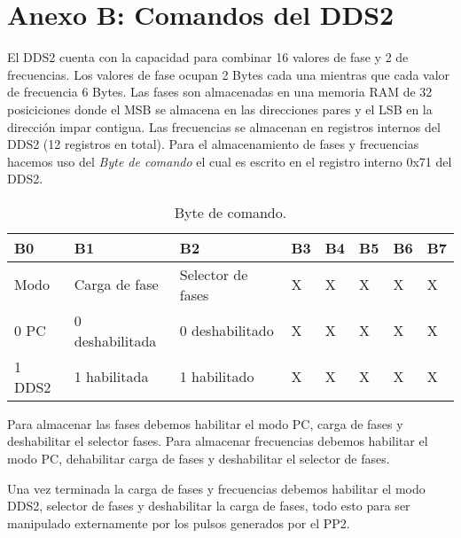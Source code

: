 \section{Anexo B: Comandos del DDS2}
El DDS2 cuenta con la capacidad para combinar 16 valores de fase y 2 de frecuencias.
Los valores de fase ocupan 2 Bytes cada una mientras que cada valor de frecuencia 6 Bytes.
Las fases son almacenadas en una memoria RAM de 32 posiciciones donde el MSB se
almacena en las direcciones pares y el LSB en la direcci\'on impar contigua.
Las frecuencias se almacenan en registros internos del DDS2 (12 registros en total).
Para el almacenamiento de fases y frecuencias hacemos uso del \textit{Byte de comando}
el cual es escrito en el registro interno 0x71 del DDS2. 

\begin{table}[ht]
    \centering
    \begin{tabular}{|l|l|l|l|l|l|l|l|}
    \hline 
    B0 & B1 & B2 & B3 & B4 & B5 & B6 & B7 \\
    \hline
    Modo   & Carga de fase    & Selector de fases & X & X & X & X & X\\
    \hline
    0 PC   & 0 deshabilitada  & 0 deshabilitado   & X & X & X & X & X\\
    1 DDS2 & 1 habilitada     & 1 habilitado      & X & X & X & X & X\\
    \hline
\end{tabular}
\caption{\label{tab:dds2_Byte_comando}Byte de comando.}
\end{table}

Para almacenar las fases debemos habilitar el modo PC, carga de fases y deshabilitar el selector fases.
Para almacenar frecuencias debemos habilitar el modo PC, dehabilitar carga de fases y deshabilitar el selector de fases.

Una vez terminada la carga de fases y frecuencias debemos habilitar el modo DDS2, selector de fases y deshabilitar la carga de fases, todo esto para ser manipulado externamente por los pulsos generados por el PP2.

